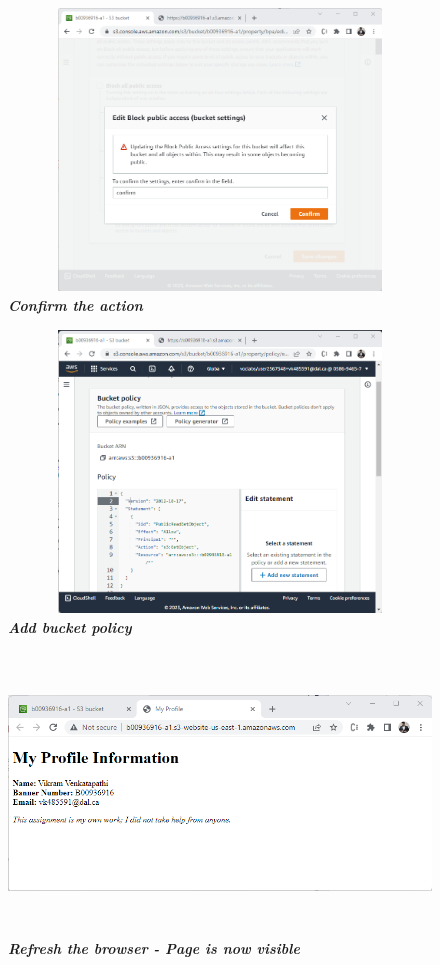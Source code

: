 \begin{figure}[htp]
    \centering
    \includegraphics[scale=1, width=15cm,height=7.5cm]{PROBLEM 2/Snaps/8.3 Confirm it.png}
    \caption{\textbf{\textit{ Confirm the action}}}
    \label{fig:confirm_deselect}
\end{figure}

\begin{figure}[htp]
    \centering
    \includegraphics[scale=1, width=15cm,height=7.5cm]{PROBLEM 2/Snaps/9. Edit bucket policy.png}
    \caption{\textbf{\textit{Add bucket policy }}}
    \label{fig:edit_policy}
\end{figure}

\begin{figure}[htp]
    \centering
    \includegraphics[scale=1, width=15cm,height=7.5cm]{PROBLEM 2/Snaps/10. Refresh browser - page visible now.png}
    \caption{\textbf{\textit{Refresh the browser - Page is now visible }}}
    \label{fig:refresh_browser}
\end{figure}

